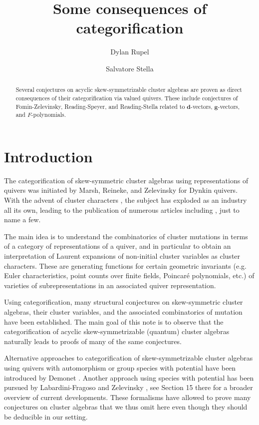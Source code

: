 \documentclass[12pt]{amsart}
\title{Some consequences of categorification}
\author[Rupel]{Dylan Rupel}
\author[Stella]{Salvatore Stella}
\newcommand{\bfd}{\mathbf{d}}
\newcommand{\bfg}{\mathbf{g}}
\begin{document}
\begin{abstract}
  Several conjectures on acyclic skew-symmetrizable cluster algebras are proven as direct consequences of their categorification via valued quivers.
  These include conjectures of Fomin-Zelevinsky, Reading-Speyer, and Reading-Stella related to $\bfd$-vectors, $\bfg$-vectors, and $F$-polynomials.
\end{abstract}
\maketitle
\vspace{-5ex}
\section{Introduction}
  The categorification of skew-symmetric cluster algebras using representations of quivers was initiated by Marsh, Reineke, and Zelevinsky \cite{marsh-reineke-zelevinsky} for Dynkin quivers.  
  With the advent of cluster characters \cite{caldero-chapoton}, the subject has exploded as an industry all its own, leading to the publication of numerous articles including \cite{caldero-chapoton-schiffler,buan-marsh-reineke-reiten-todorov,derksen-weyman-zelevinsky,geiss-leclerc-schroer,caldero-keller,caldero-keller2,plamondon,palu,rupel1,qin,rupel2}, just to name a few.  

  The main idea is to understand the combinatorics of cluster mutations in terms of a category of representations of a quiver, and in particular to obtain an interpretation of Laurent expansions of non-initial cluster variables as cluster characters.
 These are generating functions for certain geometric invariants (e.g. Euler characteristics, point counts over finite fields, Poincar\'e polynomials, etc.) of varieties of subrepresentations in an associated quiver representation.
  
  Using categorification, many structural conjectures on skew-symmetric cluster algebras, their cluster variables, and the associated combinatorics of mutation have been established.
  The main goal of this note is to observe that the categorification of acyclic skew-symmetrizable (quantum) cluster algebras \cite{rupel1,rupel2} naturally leads to proofs of many of the same conjectures.

  Alternative approaches to categorification of skew-symmetrizable cluster algebras using quivers with automorphism or group species with potential have been introduced by Demonet \cite{demonet1,demonet2}. 
  Another approach using species with potential has been pursued by Labardini-Fragoso and Zelevinsky \cite{labardini-zelevinsky}, see Section 15 there for a broader overview of current developments.
  These formalisms have allowed to prove many conjectures on cluster algebras that we thus omit here even though they should be deducible in our setting.
\end{document}
